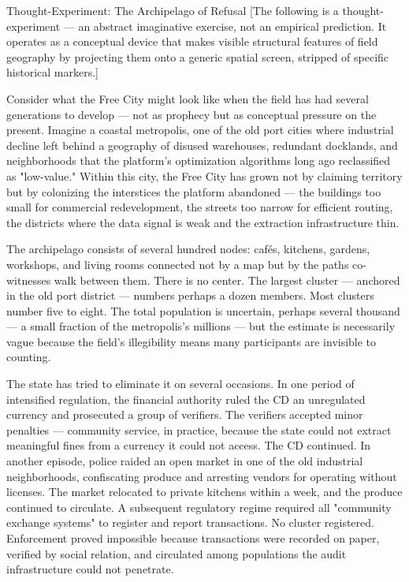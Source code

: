 Thought-Experiment: The Archipelago of Refusal [The following is a thought-experiment — an abstract imaginative exercise, not an empirical prediction. It operates as a conceptual device that makes visible structural features of field geography by projecting them onto a generic spatial screen, stripped of specific historical markers.]

Consider what the Free City might look like when the field has had several generations to develop — not as prophecy but as conceptual pressure on the present. Imagine a coastal metropolis, one of the old port cities where industrial decline left behind a geography of disused warehouses, redundant docklands, and neighborhoods that the platform's optimization algorithms long ago reclassified as "low-value." Within this city, the Free City has grown not by claiming territory but by colonizing the interstices the platform abandoned — the buildings too small for commercial redevelopment, the streets too narrow for efficient routing, the districts where the data signal is weak and the extraction infrastructure thin.

The archipelago consists of several hundred nodes: cafés, kitchens, gardens, workshops, and living rooms connected not by a map but by the paths co-witnesses walk between them. There is no center. The largest cluster — anchored in the old port district — numbers perhaps a dozen members. Most clusters number five to eight. The total population is uncertain, perhaps several thousand — a small fraction of the metropolis's millions — but the estimate is necessarily vague because the field's illegibility means many participants are invisible to counting.

The state has tried to eliminate it on several occasions. In one period of intensified regulation, the financial authority ruled the CD an unregulated currency and prosecuted a group of verifiers. The verifiers accepted minor penalties — community service, in practice, because the state could not extract meaningful fines from a currency it could not access. The CD continued. In another episode, police raided an open market in one of the old industrial neighborhoods, confiscating produce and arresting vendors for operating without licenses. The market relocated to private kitchens within a week, and the produce continued to circulate. A subsequent regulatory regime required all "community exchange systems" to register and report transactions. No cluster registered. Enforcement proved impossible because transactions were recorded on paper, verified by social relation, and circulated among populations the audit infrastructure could not penetrate.

